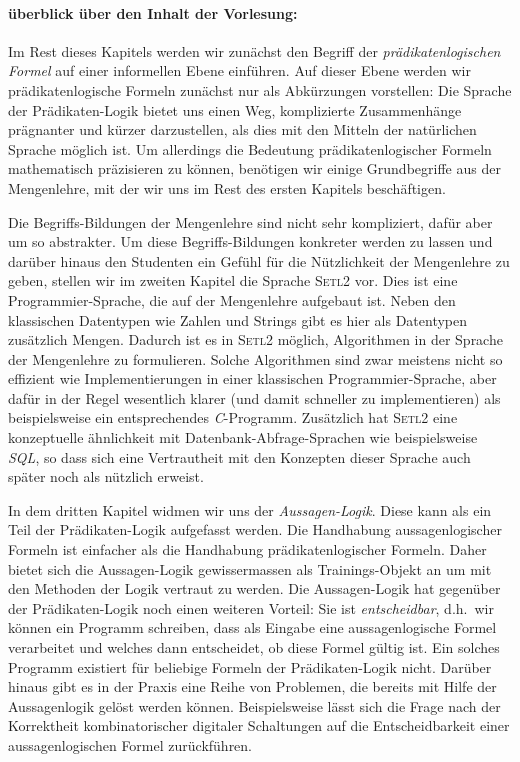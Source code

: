 \paragraph{\"{u}berblick \"{u}ber den Inhalt der Vorlesung:} 
Im Rest dieses Kapitels werden wir zun\"{a}chst den Begriff der 
\emph{pr\"{a}dikatenlogischen Formel} auf einer informellen Ebene einf\"{u}hren.  Auf dieser Ebene
werden wir pr\"{a}dikatenlogische Formeln zun\"{a}chst nur als Abk\"{u}rzungen vorstellen:
Die Sprache der Pr\"{a}dikaten-Logik bietet uns einen Weg, komplizierte
Zusammenh\"{a}nge pr\"{a}gnanter und k\"{u}rzer darzustellen, als dies mit den Mitteln der nat\"{u}rlichen
Sprache m\"{o}glich ist.  Um allerdings die Bedeutung pr\"{a}dikatenlogischer Formeln 
mathematisch pr\"{a}zisieren zu k\"{o}nnen, ben\"{o}tigen wir einige Grundbegriffe aus der
Mengenlehre, mit der wir uns im Rest des ersten Kapitels besch\"{a}ftigen.

Die Begriffs-Bildungen der Mengenlehre sind nicht sehr kompliziert, daf\"{u}r aber um so
abstrakter.  Um diese Begriffs-Bildungen konkreter werden zu lassen und dar\"{u}ber hinaus den
Studenten ein Gef\"{u}hl f\"{u}r die N\"{u}tzlichkeit der Mengenlehre zu geben, stellen wir im zweiten
Kapitel die Sprache \textsc{Setl2} vor.  Dies ist eine Programmier-Sprache, die auf der
Mengenlehre aufgebaut ist.  Neben den klassischen Datentypen wie Zahlen und Strings gibt
es hier als Datentypen zus\"{a}tzlich Mengen.  Dadurch ist es in \textsc{Setl2} m\"{o}glich,
Algorithmen in der Sprache der Mengenlehre zu formulieren.  Solche Algorithmen sind zwar
meistens nicht so effizient wie Implementierungen in einer klassischen
Programmier-Sprache, aber daf\"{u}r in der Regel wesentlich klarer (und damit schneller zu
implementieren) als beispielsweise ein entsprechendes \textsl{C}-Programm.  
Zus\"{a}tzlich hat
\textsc{Setl2} eine konzeptuelle \"{a}hnlichkeit mit Datenbank-Abfrage-Sprachen wie
beispielsweise \textsl{SQL}, so dass sich eine Vertrautheit mit den Konzepten dieser
Sprache auch sp\"{a}ter noch als n\"{u}tzlich erweist.

In dem dritten Kapitel widmen wir uns der \emph{Aussagen-Logik}.  Diese kann als ein Teil der
Pr\"{a}dikaten-Logik aufgefasst werden. Die Handhabung aussagenlogischer Formeln ist einfacher als die
Handhabung pr\"{a}dikatenlogischer Formeln.  Daher bietet sich die Aussagen-Logik gewissermassen als
Trainings-Objekt an um mit den Methoden der Logik vertraut zu werden.  Die Aussagen-Logik hat
gegen\"{u}ber der Pr\"{a}dikaten-Logik noch einen weiteren Vorteil: Sie ist \emph{entscheidbar}, d.h.~wir
k\"{o}nnen ein Programm schreiben, dass als Eingabe eine aussagenlogische Formel verarbeitet und welches
dann entscheidet, ob diese Formel g\"{u}ltig ist.  Ein solches Programm existiert f\"{u}r beliebige Formeln
der Pr\"{a}dikaten-Logik nicht.  Dar\"{u}ber hinaus gibt es in der Praxis eine Reihe von Problemen, die
bereits mit Hilfe der Aussagenlogik gel\"{o}st werden k\"{o}nnen.  Beispielsweise l\"{a}sst sich die Frage nach der
Korrektheit kombinatorischer digitaler Schaltungen auf die Entscheidbarkeit einer aussagenlogischen
Formel zur\"{u}ckf\"{u}hren.

